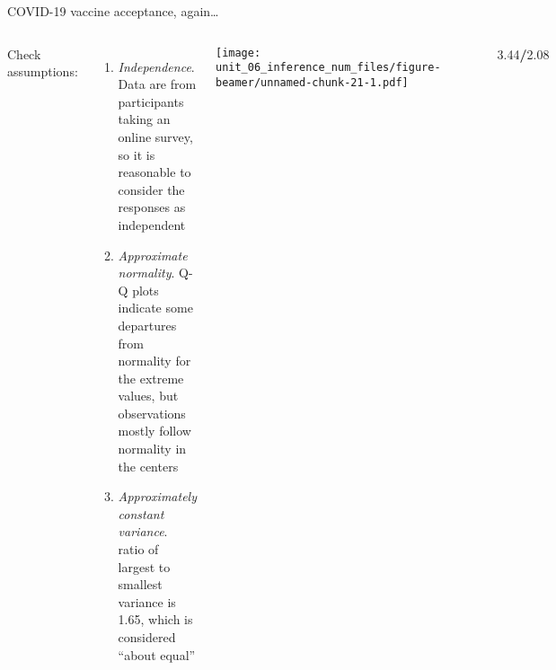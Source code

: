 \documentclass[
  ignorenonframetext,
  aspectratio=169]{beamer}
\newenvironment{Shaded}{\begin{snugshade}}{\end{snugshade}}
\newcommand{\CommentTok}[1]{\textcolor[rgb]{0.56,0.35,0.01}{\textit{#1}}}
\newcommand{\FloatTok}[1]{\textcolor[rgb]{0.00,0.00,0.81}{#1}}
\newcommand{\FunctionTok}[1]{\textcolor[rgb]{0.13,0.29,0.53}{\textbf{#1}}}
\newcommand{\NormalTok}[1]{#1}
\newcommand{\SpecialCharTok}[1]{\textcolor[rgb]{0.81,0.36,0.00}{\textbf{#1}}}
\newcommand{\columnsbegin}{\begin{columns}}
\newcommand{\columnsend}{\end{columns}}
\begin{document}
\begin{frame}[fragile]{COVID-19 vaccine acceptance, again\ldots{}}
\protect\hypertarget{covid-19-vaccine-acceptance-again-1}{}
\columnsbegin


\footnotesize

Check assumptions:

\begin{enumerate}
\item
  \emph{Independence}. Data are from participants taking an online
  survey, so it is reasonable to consider the responses as independent
\item
  \emph{Approximate normality}. Q-Q plots indicate some departures from
  normality for the extreme values, but observations mostly follow
  normality in the centers
\item
  \emph{Approximately constant variance}. ratio of largest to smallest
  variance is 1.65, which is considered ``about equal''
\end{enumerate}


\scriptsize

\texttt{[image: unit\_06\_inference\_num\_files/figure-beamer/unnamed-chunk-21-1.pdf]}

\begin{Shaded}
\end{Shaded}

\begin{verbatim}
##  republican    democrat independent 
##    3.439048    2.163715    2.083126
\end{verbatim}

\begin{Shaded}
\begin{Highlighting}[]
\FloatTok{3.44}\SpecialCharTok{/}\FloatTok{2.08}
\end{Highlighting}
\end{Shaded}

\begin{verbatim}
## [1] 1.653846
\end{verbatim}

\columnsend
\end{frame}
\end{document}

